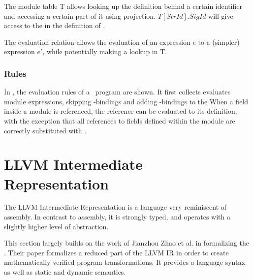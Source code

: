 The module table T allows looking up the definition behind a certain identifier and accessing a certain part of it using projection. $T[\mathit{StrId}].\mathit{SigId}$ will give access to the  in the definition of . 

The evaluation relation allows the evaluation of an expression $e$ to a (simpler) expression $e'$, while potentially making a lookup in T.

\subsubsection{Rules}
In , the evaluation rules of a \MiniML\ program are shown.
It first collects evaluates module expressions, skipping -bindings and adding -bindings to the 
When a field inside a module is referenced, the reference can be evaluated to its definition, with the exception that all references to fields  defined within the module are correctly substituted with .




\clearpage
\section{LLVM Intermediate Representation}
The LLVM Intermediate Representation is a language very reminiscent of assembly.
In contrast to assembly, it is strongly typed, and operates with a slightly higher level of abstraction.

This section largely builds on the work of Jianzhou Zhao et al. in formalizing the \LLVMIR \cite{Zhao:2012:FLI:2103656.2103709}.
Their paper formalizes a reduced part of the LLVM IR in order to create mathematically verified program transformations.
It provides a language syntax as well as static and dynamic semantics.

\newcommand{\kw}[1]{\text{\lsttext{#1}}}
